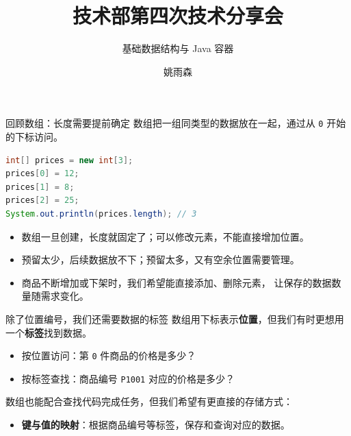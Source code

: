 \documentclass[aspectratio=169]{beamer}
\title[技术部第四次分享]{技术部第四次技术分享会}
\subtitle{基础数据结构与 Java 容器}
\author{姚雨森}
\institute{技术部 分管主席}
\date{}
\begin{document}
\maketitle

\begin{frame}[fragile]{回顾数组：长度需要提前确定}
  数组把一组同类型的数据放在一起，通过从 \texttt{0} 开始的下标访问。
  \begin{lstlisting}[language=Java]
int[] prices = new int[3];
prices[0] = 12;
prices[1] = 8;
prices[2] = 25;
System.out.println(prices.length); // 3
  \end{lstlisting}
  \begin{itemize}
    \item 数组一旦创建，长度就固定了；可以修改元素，不能直接增加位置。
    \item 预留太少，后续数据放不下；预留太多，又有空余位置需要管理。
    \item 商品不断增加或下架时，我们希望能\alert{直接添加、删除元素}，
      让保存的数据数量随需求变化。
  \end{itemize}
\end{frame}

\begin{frame}{除了位置编号，我们还需要数据的标签}
  数组用下标表示\textbf{位置}，但我们有时更想用一个\textbf{标签}找到数据。
  \par\bigskip
  \begin{itemize}
    \item 按位置访问：第 \texttt{0} 件商品的价格是多少？
    \item 按标签查找：商品编号 \texttt{P1001} 对应的价格是多少？
  \end{itemize}
  \bigskip
  数组也能配合查找代码完成任务，但我们希望有更直接的存储方式：
  \begin{itemize}
    \item \textbf{键与值的映射}：根据商品编号等标签，保存和查询对应的数据。
  \end{itemize}
\end{frame}
\end{document}
